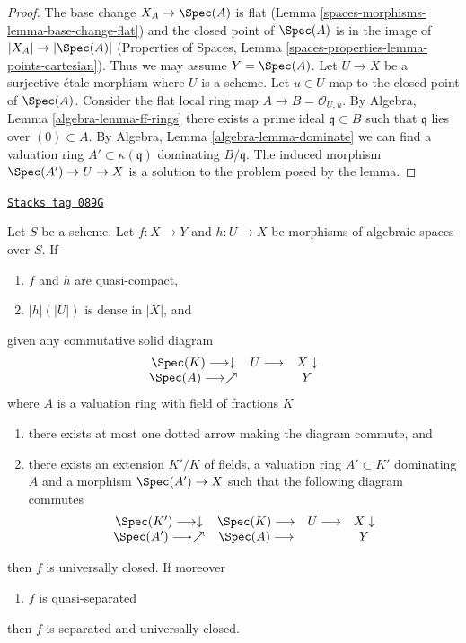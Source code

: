 \begin{proof}
The base change $X_A \to \Spec(A)$ is flat
(Lemma \ref{spaces-morphisms-lemma-base-change-flat}) and the closed point of
$\Spec(A)$ is in the image of $|X_A| \to |\Spec(A)|$
(Properties of Spaces, Lemma \ref{spaces-properties-lemma-points-cartesian}).
Thus we may assume $Y = \Spec(A)$. Let $U \to X$ be a surjective
\'etale morphism where $U$ is a scheme. Let $u \in U$ map to
the closed point of $\Spec(A)$. Consider the flat local ring map
$A \to B = \mathcal{O}_{U, u}$. By
Algebra, Lemma \ref{algebra-lemma-ff-rings}
there exists a prime ideal $\mathfrak q \subset B$ such that
$\mathfrak q$ lies over $(0) \subset A$. By
Algebra, Lemma \ref{algebra-lemma-dominate}
we can find a valuation ring $A' \subset \kappa(\mathfrak q)$
dominating $B/\mathfrak q$. The induced morphism
$\Spec(A') \to U \to X$ is a solution to the problem
posed by the lemma.
\end{proof}

\begin{lemma}
\label{spaces-morphisms-lemma-refined-valuative-criterion-universally-closed}
\href{https://stacks.math.columbia.edu/tag/089G}{\texttt{Stacks tag 089G}}

Let $S$ be a scheme. Let $f : X \to Y$ and $h : U \to X$ be morphisms of
algebraic spaces over $S$. If
\begin{enumerate}
\item $f$ and $h$ are quasi-compact,
\item $|h|(|U|)$ is dense in $|X|$, and
\end{enumerate}
given any commutative solid diagram
$$
\begin{array}{ccc}\Spec(K) \longrightarrow\downarrow & U \longrightarrow & X \downarrow \\ \Spec(A) \longrightarrow\nearrow &  & Y\end{array}
$$
where $A$ is a valuation ring with field of fractions $K$
\begin{enumerate}
\item[(3)] there exists at most one dotted arrow making the diagram
commute, and
\item[(4)] there exists an extension $K'/K$ of fields, a
valuation ring $A' \subset K'$ dominating $A$ and a morphism
$\Spec(A') \to X$ such that the following diagram commutes
$$
\begin{array}{cccc}\Spec(K') \longrightarrow\downarrow & \Spec(K) \longrightarrow & U \longrightarrow & X \downarrow \\ \Spec(A') \longrightarrow\nearrow & \Spec(A) \longrightarrow &  & Y\end{array}
$$
\end{enumerate}
then $f$ is universally closed. If moreover
\begin{enumerate}
\item[(5)] $f$ is quasi-separated
\end{enumerate}
then $f$ is separated and universally closed.
\end{lemma}

